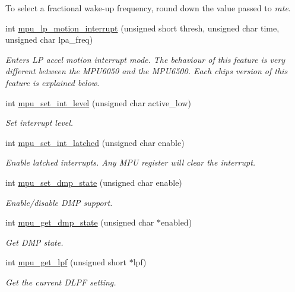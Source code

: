 \begin{DoxyCompactItemize}
\begin{DoxyCompactList}
 To select a fractional wake-\/up frequency, round down the value passed to {\itshape rate}. \end{DoxyCompactList}\item 
int \hyperlink{group___d_r_i_v_e_r_s_ga7d0b3259346898ccd1ba6ef78bf7df97}{mpu\+\_\+lp\+\_\+motion\+\_\+interrupt} (unsigned short thresh, unsigned char time, unsigned char lpa\+\_\+freq)
\begin{DoxyCompactList}\small\item\em Enters LP accel motion interrupt mode. The behaviour of this feature is very different between the M\+P\+U6050 and the M\+P\+U6500. Each chip\textquotesingle{}s version of this feature is explained below. \end{DoxyCompactList}\item 
int \hyperlink{group___d_r_i_v_e_r_s_gacc92fb1489ef32a04bcb6b0ebde4d657}{mpu\+\_\+set\+\_\+int\+\_\+level} (unsigned char active\+\_\+low)
\begin{DoxyCompactList}\small\item\em Set interrupt level. \end{DoxyCompactList}\item 
int \hyperlink{group___d_r_i_v_e_r_s_ga653cb855300bff9285ce4b8dca6a503b}{mpu\+\_\+set\+\_\+int\+\_\+latched} (unsigned char enable)
\begin{DoxyCompactList}\small\item\em Enable latched interrupts. Any M\+PU register will clear the interrupt. \end{DoxyCompactList}\item 
int \hyperlink{group___d_r_i_v_e_r_s_ga68ed20e6c9663cd7c50469329af8715f}{mpu\+\_\+set\+\_\+dmp\+\_\+state} (unsigned char enable)
\begin{DoxyCompactList}\small\item\em Enable/disable D\+MP support. \end{DoxyCompactList}\item 
int \hyperlink{group___d_r_i_v_e_r_s_gafe0f60ed0d7f8fd2dcd55d45b95a2363}{mpu\+\_\+get\+\_\+dmp\+\_\+state} (unsigned char $\ast$enabled)
\begin{DoxyCompactList}\small\item\em Get D\+MP state. \end{DoxyCompactList}\item 
int \hyperlink{group___d_r_i_v_e_r_s_gaa95c7e216dcb2d888e9796001ca555f8}{mpu\+\_\+get\+\_\+lpf} (unsigned short $\ast$lpf)
\begin{DoxyCompactList}\small\item\em Get the current D\+L\+PF setting. \end{DoxyCompactList}\item 

\end{DoxyCompactItemize}
